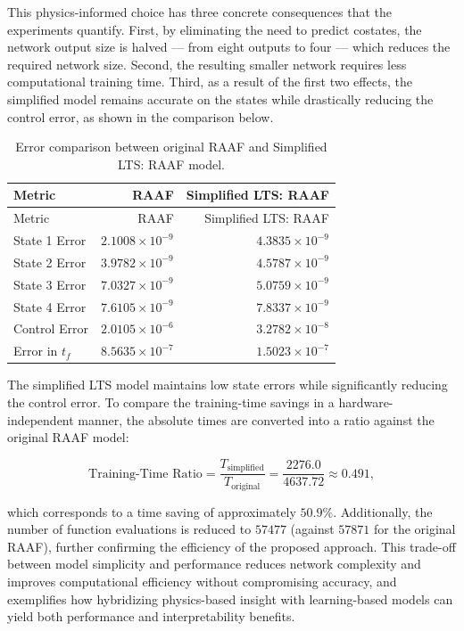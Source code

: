 \documentclass[
  number,
  preprint]{elsarticle}
\begin{document}
This physics-informed choice has three concrete consequences that the
experiments quantify. First, by eliminating the need to predict
costates, the network output size is halved --- from eight outputs to
four --- which reduces the required network size. Second, the resulting
smaller network requires less computational training time. Third, as a
result of the first two effects, the simplified model remains accurate
on the states while drastically reducing the control error, as shown in
the comparison below.

\begin{longtable}[]{@{}lrr@{}}
\caption{Error comparison between original RAAF and Simplified LTS: RAAF
model.}\label{tbl-ch3-simplified}\tabularnewline
\toprule\noalign{}
Metric & RAAF & Simplified LTS: RAAF \\
\midrule\noalign{}
\endfirsthead
\toprule\noalign{}
Metric & RAAF & Simplified LTS: RAAF \\
\midrule\noalign{}
\endhead
\bottomrule\noalign{}
\endlastfoot
State 1 Error & \(2.1008 \times 10^{-9}\) & \(4.3835 \times 10^{-9}\) \\
State 2 Error & \(3.9782 \times 10^{-9}\) & \(4.5787 \times 10^{-9}\) \\
State 3 Error & \(7.0327 \times 10^{-9}\) & \(5.0759 \times 10^{-9}\) \\
State 4 Error & \(7.6105 \times 10^{-9}\) & \(7.8337 \times 10^{-9}\) \\
Control Error & \(2.0105 \times 10^{-6}\) & \(3.2782 \times 10^{-8}\) \\
Error in \(t_f\) & \(8.5635 \times 10^{-7}\) &
\(1.5023 \times 10^{-7}\) \\
\end{longtable}

The simplified LTS model maintains low state errors while significantly
reducing the control error. To compare the training-time savings in a
hardware-independent manner, the absolute times are converted into a
ratio against the original RAAF model:

\[
\text{Training-Time Ratio}
=
\frac{T_{\text{simplified}}}{T_{\text{original}}}
=
\frac{2276.0}{4637.72}
\approx
0.491,
\]

which corresponds to a time saving of approximately \(50.9\%\).
Additionally, the number of function evaluations is reduced to \(57477\)
(against \(57871\) for the original RAAF), further confirming the
efficiency of the proposed approach. This trade-off between model
simplicity and performance reduces network complexity and improves
computational efficiency without compromising accuracy, and exemplifies
how hybridizing physics-based insight with learning-based models can
yield both performance and interpretability benefits.
\end{document}
